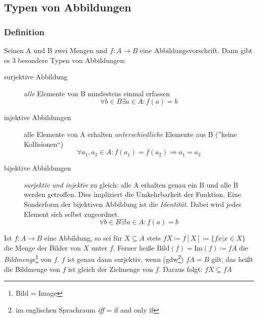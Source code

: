 \subsection{Typen von Abbildungen}\label{kap_typabb}
\subsubsection{Definition}

\begin{figure}
\hfill
{}\hfill
{}\hfill
{}
\end{figure}


Seinen A und B zwei Mengen und $f:{A}\longrightarrow{B}$ eine Abbildungsvorschrift.
Dann gibt es 3 besondere Typen von Abbildungen:
\begin{description}
\item[surjektive Abbildung] \emph{alle} Elemente von B mindestens einmal erfassen
$$ \forall b \in B \exists a \in A : f(a)=b $$
\item[injektive Abbildungen] alle Elemente von A erhalten \emph{unterschiedliche} Elemente aus B  (''keine Kollisionen``)
$$ \forall a_1,a_2  \in A : f(a_1)=f(a_2) \Rightarrow a_1 = a_2 $$
\item[bijektive Abbildungen] \emph{surjektiv und injektiv} zu gleich: alle A erhalten genau ein B und alle B werden getroffen.
Dies impliziert die Umkehrbarkeit der Funktion. Eine Sonderform der bijektiven
Abbildung ist die \emph{Identität}. Dabei wird jedes Element sich selbst zugeordnet.
$$ \forall b \in B \exists ! a \in A : f(a) = b $$
\end{description}

Ist $f \colon A \rightarrow B$ eine Abbildung, so sei für $X \subseteq A$ stets
$fX \coloneq f[X] \coloneq \{fx | x \in X\}$ die Menge der Bilder von $X$ unter
$f$.
Ferner heiße $\text{Bild}(f) = \text{Im}(f) \coloneq fA$ die
\emph{Bildmenge}\footnote{Bild = Image} von $f$. $f$ ist genau dann surjektiv,
wenn (gdw\footnote{im englischen Sprachraum \emph{iff} = if and only if}) $fA = B$
gilt, das heißt die Bildmenge von $f$ ist gleich der Zielmenge von $f$. Daraus
folgt: $fX \subseteq fA$

